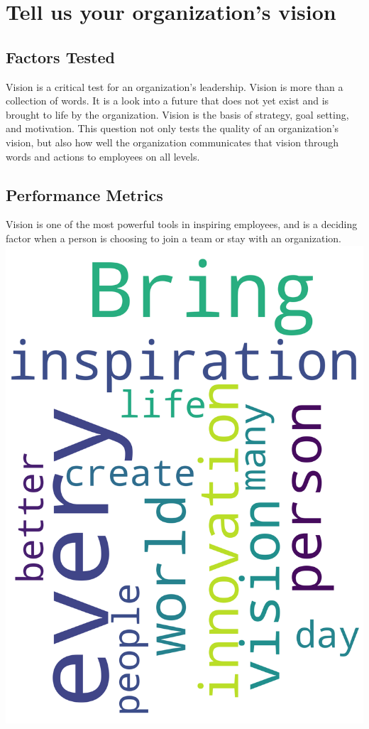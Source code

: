 \documentclass[14pt]{extreport}
\begin{document}
\newpage
\section*{Tell us your organization's vision}
\subsection*{\centering Factors Tested}
Vision is a critical test for an organization’s leadership. Vision is
more than a collection of words. It is a look into a future that
does not yet exist and is brought to life by the organization.
Vision is the basis of strategy, goal setting, and motivation. This
question not only tests the quality of an organization’s vision, but
also how well the organization communicates that vision through
words and actions to employees on all levels.
\subsection*{\centering Performance Metrics}
Vision is one of the most powerful tools in inspiring employees,
and is a deciding factor when a person is choosing to join a team
or stay with an organization.
\newpage
\includegraphics[width=.95\linewidth]{q11}
\end{document}
